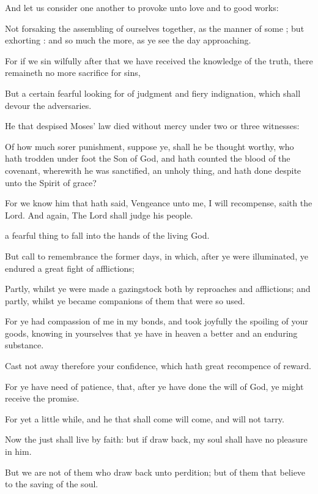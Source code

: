 {And let us
consider one
another
to
provoke unto
love
and
to
good
works:

Not
forsaking the
assembling of
ourselves
together,
as the
manner of
some
{};
but
exhorting
{}:
and so
much the
more,
as ye
see the
day
approaching.

For
if
we
sin
wilfully
after that we have
received the
knowledge of the
truth, there
remaineth no
more
sacrifice
for
sins,

But a
certain
fearful looking
for of
judgment
and
fiery
indignation,
which
shall
devour the
adversaries.

He
that
despised
Moses’
law
died
without
mercy
under
two
or
three
witnesses:

Of how
much
sorer
punishment, suppose
ye, shall he be thought
worthy, who hath trodden under
foot the
Son of
God,
and hath
counted the
blood of the
covenant,
wherewith he was
sanctified, an unholy
thing,
and hath done despite
unto the
Spirit of
grace?

For we
know him that hath
said,
Vengeance
{} unto
me,
I will
recompense,
saith the
Lord.
And
again, The
Lord shall
judge
his
people.

 a fearful
thing to
fall
into the
hands of
the
living
God.

But call to
remembrance
the
former
days,
in
which, after ye were
illuminated, ye
endured
a
great
fight of
afflictions;

Partly, whilst ye were made a
gazingstock
both by
reproaches
and
afflictions;
and
partly, whilst ye
became
companions of them that
were
so
used.

For ye had
compassion of
me in my
bonds,
and
took
joyfully the
spoiling
of
your
goods,
knowing
in
yourselves that ye
have
in
heaven
a
better
and an
enduring
substance.

Cast
not
away
therefore
your
confidence,
which
hath
great recompence of
reward.

For ye
have
need of
patience,
that, after ye have
done the
will of
God, ye might
receive the
promise.

For
yet a
little
while, and he that shall
come will
come,
and
will
not
tarry.

Now the
just shall
live
by
faith:
but
if
{} draw
back,
my
soul shall
have
no
pleasure
in
him.

But
we
are
not of them who draw
back
unto
perdition;
but of them that
believe
to the
saving of the
soul.




}
